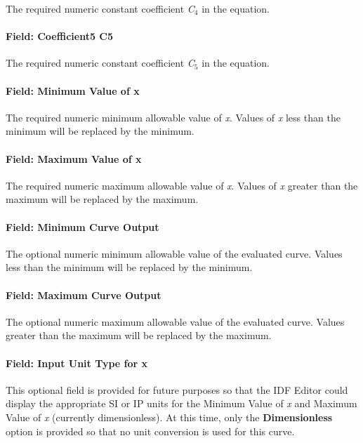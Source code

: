 The required numeric constant coefficient \emph{C\(_{4}\)} in the equation.

\paragraph{Field: Coefficient5 C5}\label{field-coefficient5-c5}

The required numeric constant coefficient \emph{C\(_{5}\)} in the equation.

\paragraph{Field: Minimum Value of x}\label{field-minimum-value-of-x-13}

The required numeric minimum allowable value of \emph{x}. Values of \emph{x} less than the minimum will be replaced by the minimum.

\paragraph{Field: Maximum Value of x}\label{field-maximum-value-of-x-14}

The required numeric maximum allowable value of \emph{x}. Values of \emph{x} greater than the maximum will be replaced by the maximum.

\paragraph{Field: Minimum Curve Output}\label{field-minimum-curve-output-13}

The optional numeric minimum allowable value of the evaluated curve. Values less than the minimum will be replaced by the minimum.

\paragraph{Field: Maximum Curve Output}\label{field-maximum-curve-output-12}

The optional numeric maximum allowable value of the evaluated curve. Values greater than the maximum will be replaced by the maximum.

\paragraph{Field: Input Unit Type for x}\label{field-input-unit-type-for-x-13}

This optional field is provided for future purposes so that the IDF Editor could display the appropriate SI or IP units for the Minimum Value of \emph{x} and Maximum Value of \emph{x} (currently dimensionless). At this time, only the \textbf{Dimensionless} option is provided so that no unit conversion is used for this curve.

